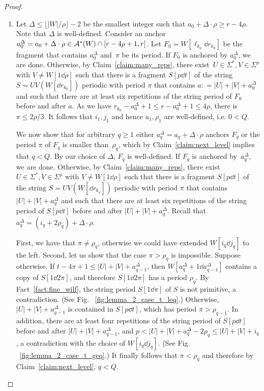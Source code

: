 \begin{proof}
\begin{enumerate}[label=\textrm{(\alph*)}]
\item Let $\Delta \le \lfloor |W|/\rho\rfloor-2$ be the smallest integer such that $a_0+\Delta \cdot \rho \ge r-4\rho$. Note that $\Delta$ is well-defined. 
 Consider an anchor $a_0^\Delta = a_0+\Delta \cdot \rho \in \mathcal{A}^\ast(W) \cap [r-4\rho+1, r]$. Let $F_0 = W[\ell_{k_0} \dd r_{k_0}]$ be the fragment that contains $a_0^\Delta$ and~$\pi$ be its period. If $F_0$ is anchored by $a_0^\Delta$, we are done. Otherwise, by Claim~\ref{claim:many_reps}, there exist~$U \in \Sigma^\ast, V \in \Sigma^\rho$ with $V \neq W[1 \dd \rho]$ such that there is a fragment $S[p \dd t]$ of the string~$S = UV(W[\dd r_{k_0}])$ periodic with period $\pi$ that contains $a: = |U|+|V|+a_0^\Delta$ and such that there are at least six repetitions of the string period of $F_0$ before and after $a$. As we have $r_{k_0}-a_0^\Delta+1 \le r-a_0^\Delta+1 \le 4\rho$, there is $\pi \le 2\rho/3$. It follows that $i_1, j_1$ and hence $a_1, \rho_1$ are well-defined, i.e. $0 < Q$. 

We now show that for arbitrary $q \ge 1$ either $a_q^\Delta = a_q + \Delta \cdot \rho$ anchors $F_q$ or the period $\pi$ of $F_q$ is smaller than~$\rho_q$, which by Claim~\ref{claim:next_level} implies that $q < Q$. By our choice of $\Delta$, $F_q$ is well-defined.  If $F_q$ is anchored by~$a_q^\Delta$, we are done.  
Otherwise, by Claim~\ref{claim:many_reps}, there exist $U \in \Sigma^\ast, V \in \Sigma^\rho$ with $V \neq W[1 \dd \rho]$ such that there is a fragment $S[p \dd t]$ of the string $S = UV(W[\dd r_{k_q}])$ periodic with period $\pi$ that contains $|U|+|V|+a_q^\Delta$ and such that there are at least six repetitions of the string period of $S[p \dd t]$ before and after $|U|+|V|+a_q^\Delta$. Recall that $a_q^\Delta = (i_q+2\rho_q) + \Delta \cdot \rho$. 

First, we have that $\pi \neq \rho_q$, otherwise we could have extended $W[i_q \dd j_q]$ to the left. Second, let us show that the case $\pi > \rho_q$ is impossible. Suppose otherwise. If $t-4\pi+1 \le |U|+|V|+a_{q-1}^\Delta$, then $W[a_q^\Delta+1 \dd a_{q-1}^\Delta]$ contains a copy of $S[1\dd 2\pi]$, and therefore $S[1\dd 2\pi]$ has a period $\rho_q$. By Fact~\ref{fact:fine_wilf}, the string period $S[1\dd \pi]$ of $S$ is not primitive, a contradiction. (See Fig. ~\ref{fig:lemma_2_case_t_leq}.) Otherwise, $|U|+|V|+a_{q-1}^\Delta$ is contained in $S[p \dd t]$, which has period $\pi > \rho_{q-1}$. In addition, there are at least four repetitions of the string period of $S[p \dd t]$ before and after $|U|+|V|+a_{q-1}^\Delta$, and $p < |U|+|V|+a_q^\Delta-2\rho_q \le |U|+|V|+i_q$, a contradiction with the choice of $W[i_q \dd j_q]$. (See Fig. ~\ref{fig:lemma_2_case_t_geq}.) It finally follows that $\pi < \rho_q$ and therefore by Claim~\ref{claim:next_level}, $q < Q$.



\end{enumerate}
\end{proof}
